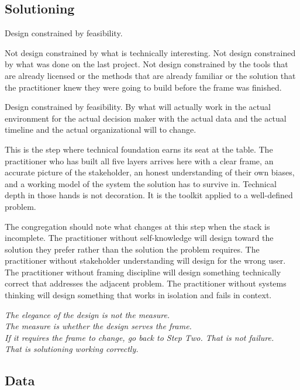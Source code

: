 \subsection*{Solutioning}

Design constrained by feasibility.

Not design constrained by what is technically interesting. Not design constrained by what was done on the last project. Not design constrained by the tools that are already licensed or the methods that are already familiar or the solution that the practitioner knew they were going to build before the frame was finished.

Design constrained by feasibility. By what will actually work in the actual environment for the actual decision maker with the actual data and the actual timeline and the actual organizational will to change.

This is the step where technical foundation earns its seat at the table. The practitioner who has built all five layers arrives here with a clear frame, an accurate picture of the stakeholder, an honest understanding of their own biases, and a working model of the system the solution has to survive in. Technical depth in those hands is not decoration. It is the toolkit applied to a well-defined problem.

The congregation should note what changes at this step when the stack is incomplete. The practitioner without self-knowledge will design toward the solution they prefer rather than the solution the problem requires. The practitioner without stakeholder understanding will design for the wrong user. The practitioner without framing discipline will design something technically correct that addresses the adjacent problem. The practitioner without systems thinking will design something that works in isolation and fails in context.

\begin{center}\small\itshape
  The elegance of the design is not the measure.\\
  The measure is whether the design serves the frame.\\
  If it requires the frame to change, go back to Step Two. That is not failure.\\
  That is solutioning working correctly.
\end{center}

\subsection*{Data}

